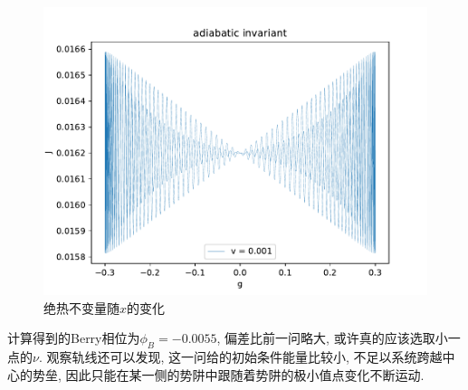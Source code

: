 \documentclass[a4paper,zihao=5,UTF8]{ctexart}
\begin{document}
    \begin{figure}[htbp]
        \centering
        \includegraphics[scale=0.6]{5x_ad_invr_v=0_001.pdf}
        \caption{绝热不变量随$x$的变化}
        \label{5 x ad}
    \end{figure}
    \par 
    计算得到的Berry相位为$\phi_B = -0.0055$, 偏差比前一问略大, 或许真的应该选取小一点的$\nu$. 观察轨线还可以发现, 
    这一问给的初始条件能量比较小, 不足以系统跨越中心的势垒, 因此只能在某一侧的势阱中跟随着势阱的极小值点变化不断运动.
\end{document}
